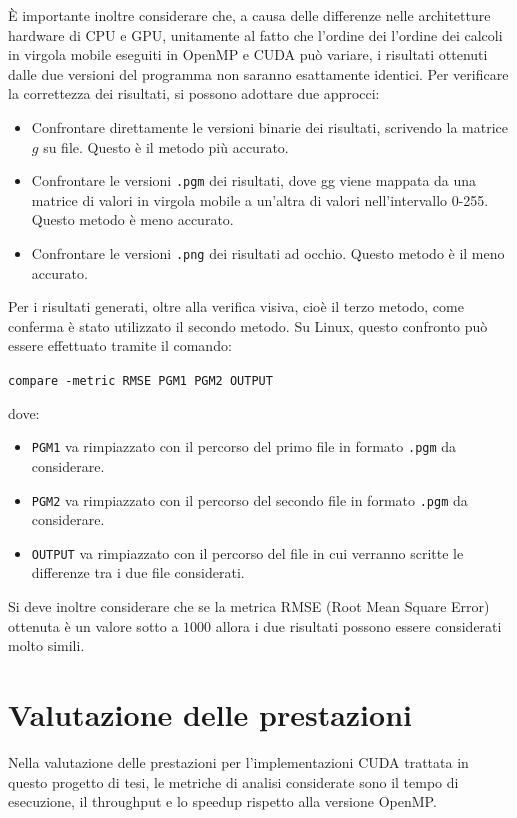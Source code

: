 \documentclass[12pt,a4paper]{report}
\begin{document}
È importante inoltre considerare che, a causa delle differenze nelle architetture hardware di CPU e GPU, unitamente al fatto che
l'ordine dei l'ordine dei calcoli in virgola mobile eseguiti in OpenMP e CUDA può variare, i risultati ottenuti dalle due versioni
del programma non saranno esattamente identici.
Per verificare la correttezza dei risultati, si possono adottare due approcci:
\begin{itemize}
  \item Confrontare direttamente le versioni binarie dei risultati, scrivendo la matrice \(g\) su file.
        Questo è il metodo più accurato.
  \item Confrontare le versioni \lstinline{.pgm} dei risultati, dove gg viene mappata da una matrice di valori in virgola mobile a
        un'altra di valori nell'intervallo 0-255.
        Questo metodo è meno accurato.
  \item Confrontare le versioni \lstinline{.png} dei risultati ad occhio.
        Questo metodo è il meno accurato.
\end{itemize}
Per i risultati generati, oltre alla verifica visiva, cioè il terzo metodo, come conferma è stato utilizzato il secondo metodo.
Su Linux, questo confronto può essere effettuato tramite il comando:

\lstinline{compare -metric RMSE PGM1 PGM2 OUTPUT}

dove:
\begin{itemize}
  \item \lstinline{PGM1} va rimpiazzato con il percorso del primo file in formato \lstinline{.pgm} da considerare.
  \item \lstinline{PGM2} va rimpiazzato con il percorso del secondo file in formato \lstinline{.pgm} da considerare.
  \item \lstinline{OUTPUT} va rimpiazzato con il percorso del file in cui verranno scritte le differenze tra i due file
        considerati.
\end{itemize}

Si deve inoltre considerare che se la metrica RMSE (Root Mean Square Error) ottenuta è un valore sotto a \(1000\) allora i due
risultati possono essere considerati molto simili.

\chapter{Valutazione delle prestazioni} \label{chap:perf}

Nella valutazione delle prestazioni per l'implementazioni CUDA trattata in questo progetto di tesi, le metriche di analisi
considerate sono il tempo di esecuzione, il throughput e lo speedup rispetto alla versione OpenMP.
\end{document}
